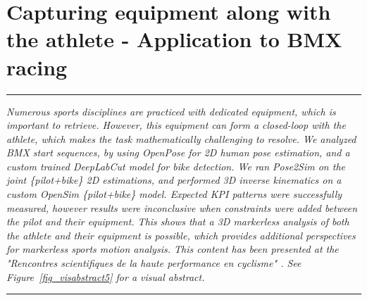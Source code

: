 
\lhead[\fancyplain{}{\leftmark}]%
      {\fancyplain{}{}} %
\chead[\fancyplain{}{}]%
      {\fancyplain{}{}}
\rhead[\fancyplain{}{}]%
      {\fancyplain{}{\rightmark}}%
\lfoot[\fancyplain{}{}]%
      {\fancyplain{}{}}
\cfoot[\fancyplain{}{\thepage}]%
      {\fancyplain{}{\thepage}} %
\rfoot[\fancyplain{}{}]%
     {\fancyplain{}{\scriptsize}}



\chapter{Capturing equipment along with the athlete - Application to BMX racing}
\label{ch:7}


\begin{center}
\rule{0.7\linewidth}{.5pt}
\begin{minipage}{0.7\linewidth}
\smallskip

\textit{Numerous sports disciplines are practiced with dedicated equipment, which is important to retrieve. However, this equipment can form a closed-loop with the athlete, which makes the task mathematically challenging to resolve. \newline\newline
We analyzed BMX start sequences, by using OpenPose for 2D human pose estimation, and a custom trained DeepLabCut model for bike detection. We ran Pose2Sim on the joint \{pilot+bike\} 2D estimations, and performed 3D inverse kinematics on a custom OpenSim \{pilot+bike\} model. Expected KPI patterns were successfully measured, however results were inconclusive when constraints were added between the pilot and their equipment. This shows that a 3D markerless analysis of both the athlete and their equipment is possible, which provides additional perspectives for markerless sports motion analysis.\newline\newline
This content has been presented at the "Rencontres scientifiques de la haute performance en cyclisme" \cite{Pagnon2022e}. See Figure~\ref{fig_visabstract5} for a visual abstract.
}

\end{minipage}
\smallskip
\rule{0.7\linewidth}{.5pt}
\end{center}

